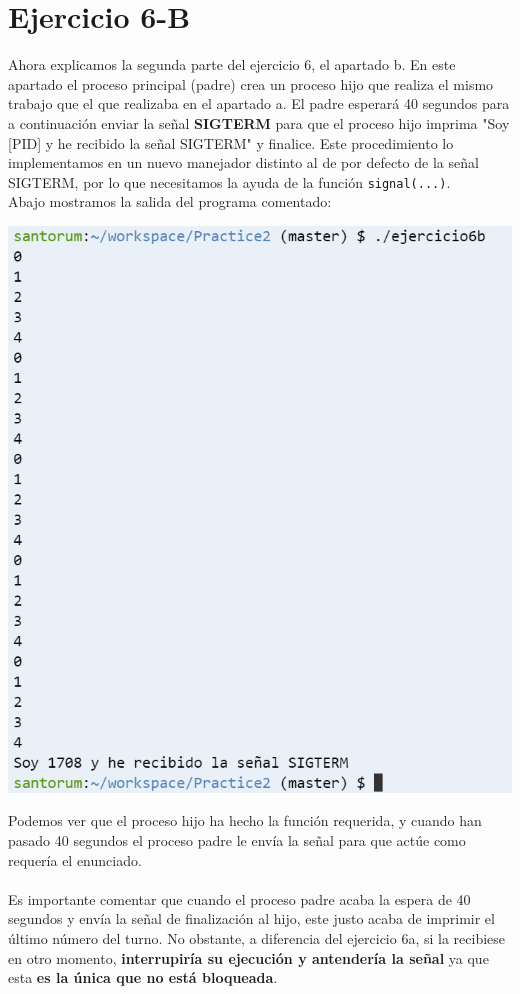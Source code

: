 \documentclass[12pt]{article}
\begin{document}
\section{Ejercicio 6-B}
Ahora explicamos la segunda parte del ejercicio 6, el apartado b. En este apartado el proceso principal (padre) crea un proceso hijo que realiza el mismo trabajo que el que realizaba en el apartado a. El padre esperará 40 segundos para a continuación enviar la señal \textbf{SIGTERM} para que el proceso hijo imprima "Soy [PID] y he recibido la señal SIGTERM" y finalice. Este procedimiento lo implementamos en un nuevo manejador distinto al de por defecto de la señal SIGTERM, por lo que necesitamos la ayuda de la función \texttt{signal(...)}.
\\Abajo mostramos la salida del programa comentado:
\begin{center}
	\includegraphics[scale=0.9]{ej6b_1.PNG}
\end{center}
Podemos ver que el proceso hijo ha hecho la función requerida, y cuando han pasado 40 segundos el proceso padre le envía la señal para que actúe como requería el enunciado.\\\\
Es importante comentar que cuando el proceso padre acaba la espera de 40 segundos y envía la señal de finalización al hijo, este justo acaba de imprimir el último número del turno. No obstante, a diferencia del ejercicio 6a, si la recibiese en otro momento, \textbf{interrupiría su ejecución y antendería la señal} ya que esta \textbf{ es la única que no está bloqueada}.\\
\end{document}
